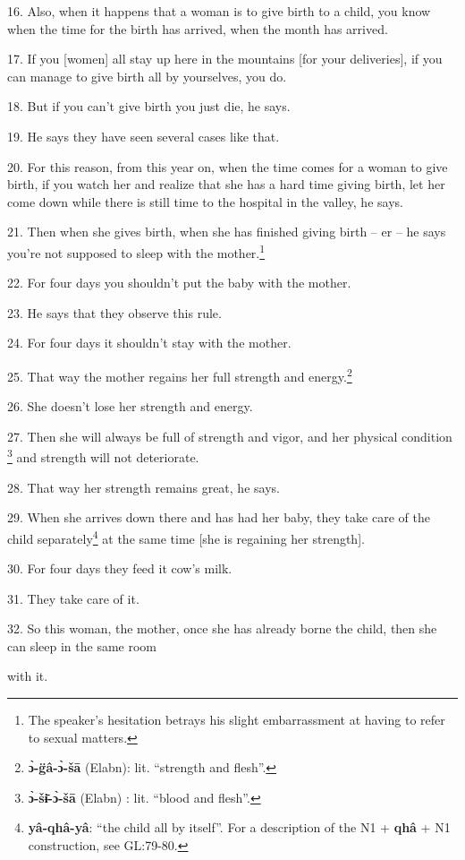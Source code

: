 16. Also, when it happens that a woman is to give birth to a child, you know when
the time for the birth has arrived, when the month has arrived.

17. If you [women] all stay up here in the mountains [for your deliveries], if
you can manage to give birth all by yourselves, you do.

18. But if you can't give birth you just die, he says.

19. He says they have seen several cases like that.

20. For this reason, from this year on, when the time comes for a woman to give
birth, if you watch her and realize that she has a hard time giving birth, let
her come down while there is still time to the hospital in the valley, he says.

21. Then when she gives birth, when she has finished giving birth -- er -- he says
you're not supposed to sleep with the mother.\footnote{The speaker's hesitation betrays his slight embarrassment at having to refer to sexual matters.}

22. For four days you shouldn't put the baby with the mother.

23. He says that they observe this rule.

24. For four days it shouldn't stay with the mother.

25. That way the mother regains her full strength and energy.\footnote{\textbf{ɔ̀-g̈â-ɔ̀-šā} (Elabn): lit. ``strength and flesh''.}

26. She doesn't lose her strength and energy.

27. Then she will always be full of strength and vigor, and her physical condition
\footnote{\textbf{ɔ̀-šɨ̄-ɔ̀-šā} (Elabn) : lit. ``blood and flesh''.} and strength will not deteriorate.

28. That way her strength remains great, he says.

29. When she arrives down there and has had her baby, they take care of the child
separately\footnote{\textbf{yâ-qhâ-yâ}: ``the child all by itself''. For a description of the N1 + \textbf{qhâ} + N1 construction, see GL:79-80.} at the same time [she is regaining her strength].

30. For four days they feed it cow's milk.

31. They take care of it.

32. So this woman, the mother, once she has already borne the child, then she can
sleep in the same room

with it.

